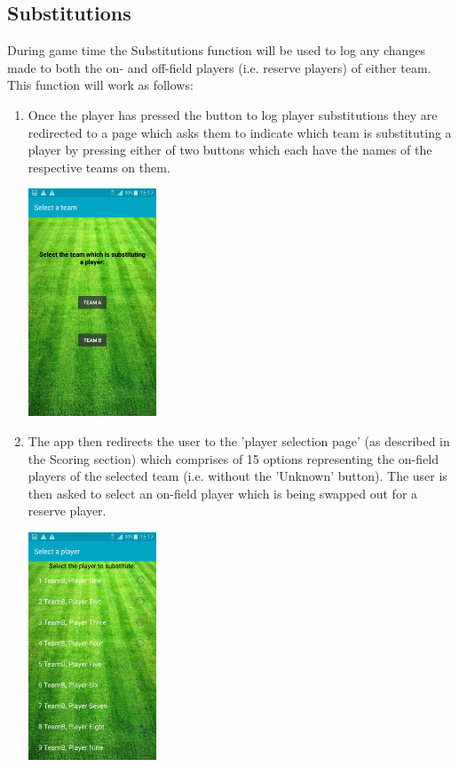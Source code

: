 \documentclass[hidelinks,a4paper,12pt]{article}
\begin{document}
	\subsection{Substitutions}
		During game time the Substitutions function will be used to log any changes made to both the on- and off-field players (i.e. reserve players) of either team. This function will work as follows:
		\begin{enumerate}
			\item Once the player has pressed the button to log player substitutions they are redirected to a page which asks them to indicate which team is substituting a player by pressing either of two buttons which each have the names of the respective teams on them.
			\begin{center}
  				 \includegraphics[width=0.3\textwidth] {./images/choose_substitute.png}\\[0.4cm]
			\end{center}
			\item The app then redirects the user to the 'player selection page' (as described in the Scoring section) which comprises of 15 options representing the on-field players of the selected team (i.e. without the 'Unknown' button). The user is then asked to select an on-field player which is being swapped out for a reserve player.
			\begin{center}
  				 \includegraphics[width=0.3\textwidth] {./images/choose_substitute_player.png}\\[0.4cm]

\end{center}
\end{enumerate}
\end{document}
